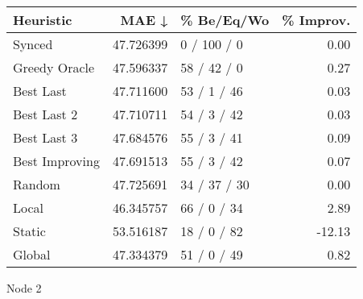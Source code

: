 \begin{tabular}{lrlr}
\toprule
      Heuristic &      MAE ↓ &    \% Be/Eq/Wo & \% Improv. \\
\midrule
         Synced &  47.726399 &   0 / 100 / 0 &      0.00 \\
  Greedy Oracle &  47.596337 &   58 / 42 / 0 &      0.27 \\
      Best Last &  47.711600 &   53 / 1 / 46 &      0.03 \\
    Best Last 2 &  47.710711 &   54 / 3 / 42 &      0.03 \\
    Best Last 3 &  47.684576 &   55 / 3 / 41 &      0.09 \\
 Best Improving &  47.691513 &   55 / 3 / 42 &      0.07 \\
         Random &  47.725691 &  34 / 37 / 30 &      0.00 \\
          Local &  46.345757 &   66 / 0 / 34 &      2.89 \\
         Static &  53.516187 &   18 / 0 / 82 &    -12.13 \\
         Global &  47.334379 &   51 / 0 / 49 &      0.82 \\
\bottomrule
\end{tabular}
\caption{Node 2}
\label{tab:non_lr005_le1_bs2_2}
